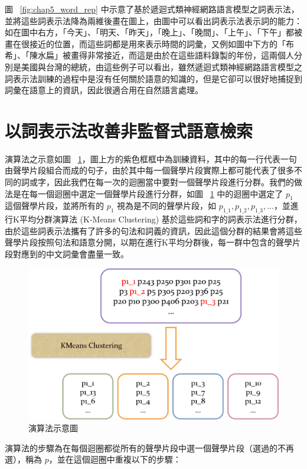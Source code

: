 圖 ~\ref{fig:chap5_word_rep}
中示意了基於遞迴式類神經網路語言模型之詞表示法，並將這些詞表示法降為兩維後畫在圖上，由圖中可以看出詞表示法表示詞的能力：如在圖中右方，「今天」、「明天、「昨天」，「晚上」、「晚間」、「上午」、「下午」都被畫在很接近的位置，而這些詞都是用來表示時間的詞彙，又例如圖中下方的「布希」、「陳水扁」被畫得非常接近，而這是由於在這些語料錄製的年份，這兩個人分別是美國與台灣的總統，由這些例子可以看出，雖然遞迴式類神經網路語言模型之詞表示法訓練的過程中是沒有任何關於語意的知識的，但是它卻可以很好地捕捉到詞彙在語意上的資訊，因此很適合用在自然語言處理。

\section{以詞表示法改善非監督式語意檢索}
\label{sec:chap5_algorithm}
演算法之示意如圖 ~\ref{fig:chap5_system}，圖上方的紫色框框中為訓練資料，其中的每一行代表一句由聲學片段組合而成的句子，由於其中每一個聲學片段實際上都可能代表了很多不同的詞或字，因此我們在每一次的迴圈當中要對一個聲學片段進行分群。我們的做法是在每一個迴圈中選定一個聲學片段進行分群，如圖 ~\ref{fig:chap5_system} 中的迴圈中選定了 $p_1$ 這個聲學片段，並將所有的 $p_1$ 視為是不同的聲學片段，如 $p_{1\_1},
p_{1\_2}, p_{1\_3}, ...$，並進行K平均分群演算法 (K-Means Clustering) 基於這些詞和字的詞表示法進行分群，由於這些詞表示法攜有了許多的句法和詞義的資訊，因此這個分群的結果會將這些聲學片段按照句法和語意分開，以期在進行K平均分群後，每一群中包含的聲學片段對應到的中文詞彙會盡量一致。

\begin{figure}
\centering
\includegraphics[scale=0.6]{images/chap5_system.png}
\caption{演算法示意圖} \label{fig:chap5_system}
\end{figure}

演算法的步驟為在每個迴圈都從所有的聲學片段中選一個聲學片段（選過的不再選），稱為 $p$，並在這個迴圈中重複以下的步驟：

